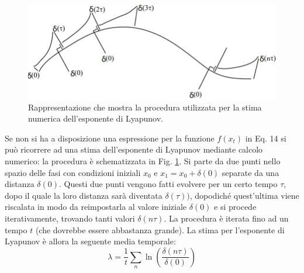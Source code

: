 \documentclass[12pt]{article}
\begin{document}
\begin{figure}
	\centering
	\includegraphics[scale = 0.6]{Lyap_Exp_Calc}
	\caption{Rappresentazione che mostra la procedura utilizzata per la stima numerica dell'esponente di Lyapunov.}
	\label{Ly}
\end{figure}
Se non si ha a disposizione una espressione per la funzione $f(x_t)$ in Eq. 14 si può ricorrere ad una stima dell'esponente di Lyapunov mediante calcolo numerico: la procedura è schematizzata in Fig. \ref{Ly}.
Si parte da due punti nello spazio delle fasi con condizioni iniziali  $x_0$ e $x_1 = x_0 + \delta(0)$ separate da una distanza $\delta(0)$. Questi due punti vengono fatti evolvere per un certo tempo $\tau$, dopo il quale la loro distanza sarà diventata $\delta(\tau))$, dopodiché quest'ultima viene riscalata in modo da reimpostarla al valore iniziale $\delta(0)$ e si procede iterativamente, trovando tanti valori $\delta(n\tau)$. La procedura è iterata fino ad un tempo $t$ (che dovrebbe essere abbastanza grande).
La stima per l'esponente di Lyapunov è allora la seguente media temporale:
\begin{equation}
	\lambda = \frac{1}{t}\sum_{n} \ln\left(\frac{\delta(n \tau)}{\delta(0)}\right)
\end{equation}
\end{document}
